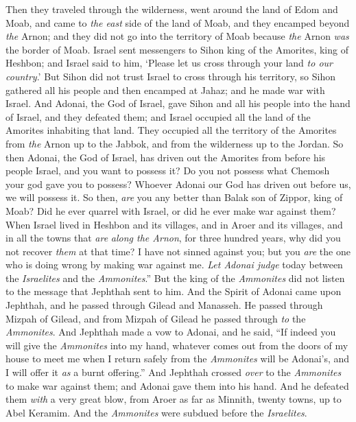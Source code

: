 \begin{biblechapter}
\verse Then they traveled through the wilderness, went around the land of Edom and Moab, and came to \textit{the east} side of the land of Moab, and they encamped beyond \textit{the} Arnon; and they did not go into the territory of Moab because \textit{the} Arnon \textit{was} the border of Moab.
\verse Israel sent messengers to Sihon king of the Amorites, king of Heshbon; and Israel said to him, ‘Please let us cross through your land \textit{to our country}.’
\verse But Sihon did not trust Israel to cross through his territory, so Sihon gathered all his people and then encamped at Jahaz; and he made war with Israel.
\verse And Adonai, the God of Israel, gave Sihon and all his people into the hand of Israel, and they defeated them; and Israel occupied all the land of the Amorites inhabiting that land.
\verse They occupied all the territory of the Amorites from \textit{the} Arnon up to the Jabbok, and from the wilderness up to the Jordan.
\verse So then Adonai, the God of Israel, has driven out the Amorites from before his people Israel, and you want to possess it?
\verse Do you not possess what Chemosh your god gave you to possess? Whoever Adonai our God has driven out before us, we will possess it.
\verse So then, \textit{are} you any better than Balak son of Zippor, king of Moab? Did he ever quarrel with Israel, or did he ever make war against them?
\verse When Israel lived in Heshbon and its villages, and in Aroer and its villages, and in all the towns that \textit{are} \textit{along the Arnon}, for three hundred years, why did you not recover \textit{them} at that time?
\verse I have not sinned against you; but you \textit{are} the one who is doing wrong by making war against me. \textit{Let Adonai judge} today between the \textit{Israelites} and the \textit{Ammonites}.”
\verse But the king of the \textit{Ammonites} did not listen to the message that Jephthah sent to him.
 And the Spirit of Adonai came upon Jephthah, and he passed through Gilead and Manasseh. He passed through Mizpah of Gilead, and from Mizpah of Gilead he passed through \textit{to} the \textit{Ammonites}.
\verse And Jephthah made a vow to Adonai, and he said, “If indeed you will give the \textit{Ammonites} into my hand,
\verse whatever comes out from the doors of my house to meet me when I return safely from the \textit{Ammonites} will be Adonai’s, and I will offer it \textit{as} a burnt offering.”
\verse And Jephthah crossed \textit{over} to the \textit{Ammonites} to make war against them; and Adonai gave them into his hand.
\verse And he defeated them \textit{with} a very great blow, from Aroer as far as Minnith, twenty towns, up to Abel Keramim. And the \textit{Ammonites} were subdued before the \textit{Israelites}.

\end{biblechapter}
